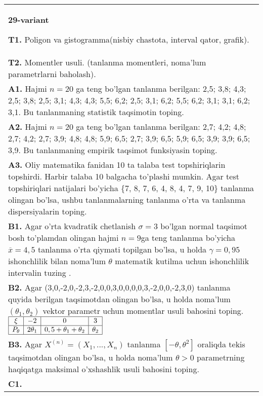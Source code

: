 \documentclass{article}
\begin{document}
\begin{tabular}{m{17cm}}
\textbf{29-variant}
\newline

\textbf{T1.} 
Poligon va gistogramma(nisbiy chastota, interval qator, grafik).
\\
\textbf{T2.} 
Momentler usuli. (tanlanma momentleri, noma'lum parametrlarni baholash).
\\
\textbf{A1.} 
Hajmi \(n = 20\) ga teng bo'lgan tanlanma berilgan: 2,5; 3,8; 4,3; 2,5; 3,8; 2,5; 3,1; 4,3; 4,3; 5,5; 6,2; 2,5; 3,1; 6,2; 5,5; 6,2; 3,1; 3,1; 6,2; 3,1. Bu tanlanmaning statistik taqsimotin toping.
\\
\textbf{A2.} 
Hajmi \(n = 20\) ga teng bo'lgan tanlanma berilgan: 2,7; 4,2; 4,8; 2,7; 4,2; 2,7; 3,9; 4,8; 4,8; 5,9; 6,5; 2,7; 3,9; 6,5; 5,9; 6,5; 3,9; 3,9; 6,5; 3,9. Bu tanlanmaning empirik taqsimot funksiyasin toping.
\\
\textbf{A3.} 
Oliy matematika fanidan 10 ta talaba test topshiriqlarin topshirdi. Harbir talaba 10 balgacha to'plashi mumkin. Agar test topshiriqlari natijalari bo'yicha \{7, 8, 7, 6, 4, 8, 4, 7, 9, 10\} tanlanma olingan bo'lsa, ushbu tanlanmalarning tanlanma o'rta va tanlanma dispersiyalarin toping.
\\
\textbf{B1.} 
Agar o'rta kvadratik chetlanish \(\sigma = 3\) bo'lgan normal taqsimot bosh to'plamdan olingan hajmi \(n = 9\)ga teng tanlanma bo'yicha \(\overline{x} = 4,5\) tanlanma o'rta qiymati topilgan bo'lsa, u holda \(\gamma = 0,95\) ishonchlilik bilan noma'lum \(\theta\) matematik kutilma uchun ishonchlilik intervalin tuzing .
\\
\textbf{B2.} 
Agar (3,0,-2,0,-2,3,-2,0,0,3,0,0,0,0,3,-2,0,0,-2,3,0) tanlanma quyida berilgan taqsimotdan olingan bo'lsa, u holda noma'lum \(\left( \theta_{1},\theta_{2} \right)\) vektor parametr uchun momentlar usuli bahosini toping.
$\begin{array}{|c|c|c|c|}
    \hline
    \xi & - 2 & 0 & 3 \\
    \hline
    P_{\theta} & 2\theta_{1} & 0,5 + \theta_{1} + \theta_{2} & \theta_{2} \\
    \hline
\end{array}$
\\
\textbf{B3.} 
Agar \(X^{(n)} = \left( X_{1},...,X_{n} \right)\) tanlanma \(\left\lbrack - \theta,\theta^{2} \right\rbrack\) oraliqda tekis taqsimotdan olingan bo'lsa, u holda noma'lum \(\theta > 0\) parametrning haqiqatga maksimal o'xshashlik usuli bahosini toping.
\\
\textbf{C1.} 

\end{tabular}
\end{document}
